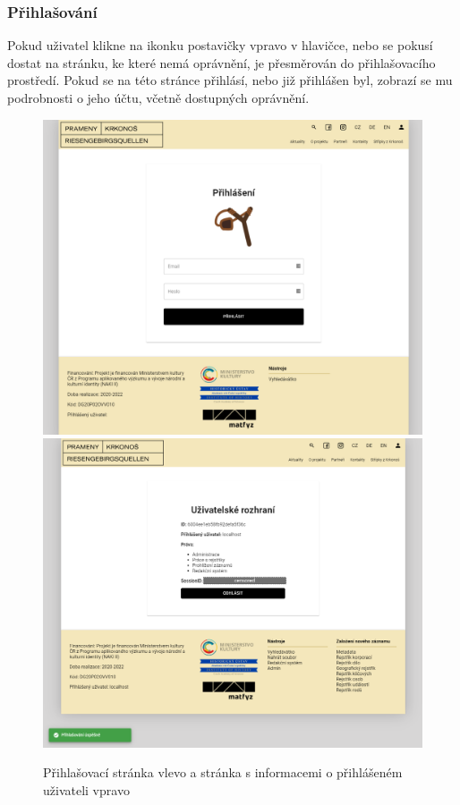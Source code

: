 \subsubsection{Přihlašování}
Pokud uživatel klikne na ikonku postavičky vpravo v hlavičce, nebo se pokusí dostat
na stránku, ke které nemá oprávnění, je přesměrován do přihlašovacího prostředí.
Pokud se na této stránce přihlásí, nebo již přihlášen byl, zobrazí se mu podrobnosti o jeho účtu,
včetně dostupných oprávnění.\\
\begin{figure}[H]
	\centering
	\includegraphics[width=.49\linewidth]{img/loginSceneB.png}
	\includegraphics[width=.5\linewidth]{img/loginSceneA.png}
	\caption{Přihlašovací stránka vlevo a stránka s informacemi o přihlášeném uživateli vpravo}
\end{figure}


